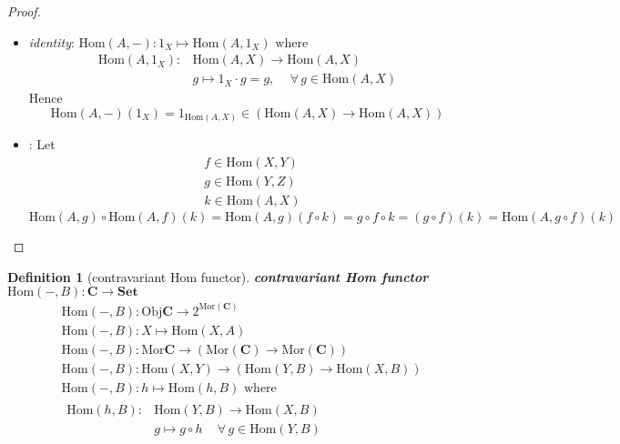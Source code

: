 \documentclass[10pt]{amsart}
\newtheorem{definition}{Definition}
\newenvironment{claim}[1]{\par\noindent\underline{Claim:}\space#1}{}
\begin{document}
\begin{multicols*}{2}

\begin{proof}
	\begin{itemize}
		\item \emph{identity}: $\text{Hom}(A,-) : 1_X \mapsto \text{Hom}(A, 1_X) \text{ where }$ 
		\[
		\begin{aligned}
			\text{Hom}(A, 1_X) : & \text{Hom}(A,X) \to \text{Hom}(A,X) \\ 
			& g\mapsto 1_X \cdot g = g , \quad \, \forall \, g\in \text{Hom}(A,X)
		\end{aligned}
		\]
		Hence
		\[
		\text{Hom}(A, -)(1_X) = 1_{\text{Hom}(A,X)} \in (\text{Hom}(A,X) \to \text{Hom}(A,X))
		\]
		\item {}: Let 
		\[
		\begin{aligned}
		& f \in \text{Hom}(X,Y) \\ 
		& g \in \text{Hom}(Y,Z) \\ 
		& k \in \text{Hom}(A,X) 
		\end{aligned}
		\]
		\[
		\text{Hom}(A, g) \circ \text{Hom}(A,f)(k) = \text{Hom}(A,g)(f\circ k) = g\circ f \circ k = (g\circ f)(k) = \text{Hom}(A, g\circ f)(k)
		\]
	\end{itemize}
\end{proof}

\begin{definition}[contravariant Hom functor]
	\textbf{contravariant Hom functor} $\text{Hom}(-, B): \mathbf{C} \to \mathbf{Set}$
	\begin{equation}
	\begin{aligned}
	& \text{Hom}(-, B ) : \text{Obj}\mathbf{C} \to  2^{\text{Mor}(\mathbf{C})} \\ 
	& \text{Hom}(-, B ) : X \mapsto \text{Hom}(X,A) \\ 
	& \text{Hom}(-, B ) : \text{Mor}\mathbf{C} \to (\text{Mor}(\mathbf{C}) \to \text{Mor}(\mathbf{C})) \\
	& \text{Hom}(-, B ) : \text{Hom}(X,Y) \to (\text{Hom}(Y,B) \to \text{Hom}(X,B)) \\
	& \text{Hom}(-, B ) : h \mapsto \text{Hom}(h,B) \text{ where } \\
	& \begin{aligned} \text{Hom}(h,B) : & \text{Hom}(Y,B) \to \text{Hom}(X,B) \\ 
	& g\mapsto g\circ h \quad \, \forall \, g \in \text{Hom}(Y,B) 
	\end{aligned} 
	\end{aligned}
	\end{equation}
\end{definition}


\end{multicols*}
\end{document}

